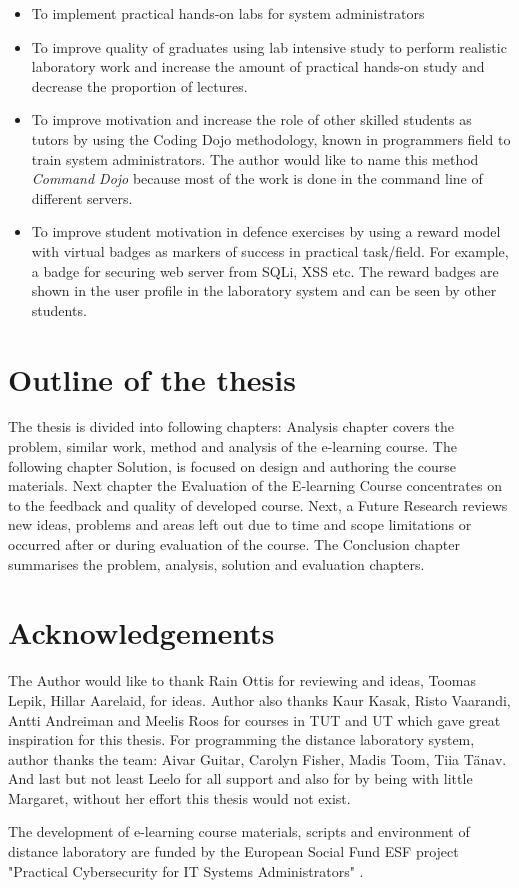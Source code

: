 \begin{itemize}
\item To implement practical hands-on labs for system administrators
\item To improve quality of graduates using lab intensive study  to perform realistic laboratory work and increase the amount of practical hands-on study and decrease the proportion of lectures.
\item To improve motivation and increase the role of other skilled students as tutors by  using the \gls{Coding Dojo} methodology, known in programmers field to train system administrators. The author would like to name this method  \emph{Command Dojo} because most of the work is done in the command line of different servers.
\item To improve student motivation in defence exercises by using a reward model with virtual badges as markers of success in practical task/field. For example, a badge for securing web server from \gls{SQLi}, \gls{XSS} etc. The reward badges are shown in the user profile in the laboratory system and can be seen by other students.
\end{itemize}
\par


\section{Outline of the thesis}
The thesis is divided into following chapters: Analysis chapter covers the problem, similar work, method and analysis of the e-learning course. The following chapter Solution, is focused on design and authoring the course materials. Next chapter the Evaluation of the E-learning Course concentrates on to the feedback and quality of developed course. Next, a Future Research reviews new ideas, problems and areas left out due to time and scope limitations or occurred after or during evaluation of the course. The Conclusion chapter summarises the problem, analysis, solution and evaluation chapters.



\section{Acknowledgements}
The Author would like to thank Rain Ottis for reviewing and ideas, Toomas Lepik, Hillar Aarelaid, for ideas. Author also thanks Kaur Kasak, Risto Vaarandi, Antti Andreiman and Meelis Roos for courses in TUT and UT which gave great inspiration for this thesis. For programming the distance laboratory system, author thanks the team: Aivar Guitar, Carolyn Fisher, Madis Toom, Tiia Tänav. And last but not least Leelo for all support and also for by being with little Margaret, without her effort this thesis would not exist.

The development of e-learning course materials, scripts and environment of distance laboratory are funded by the European Social Fund \gls{ESF} project "Practical Cybersecurity for IT Systems Administrators" \citep{website:ESF_project}.


